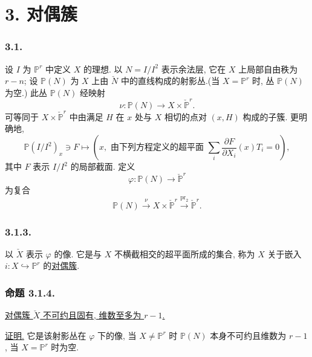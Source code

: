 \section*{3. 对偶簇}

\subsubsection*{3.1.}
设 $I$ 为 $\mathbb P^r$ 中定义 $X$ 的理想. 以 $N=I/I^2$ 表示余法层, 它在 $X$ 上局部自由秩为 $r-n$; 设 $\mathbb P(N)$ 为 $X$ 上由 $\check N$ 中的直线构成的射影丛.(当 $X=\mathbb P^r$ 时, 丛 $\mathbb P(N)$ 为空.) 此丛 $\mathbb P(N)$ 经映射
\[
\nu:\mathbb P(N)\longrightarrow X\times\check{\mathbb P}^{r}.
\]
可等同于 $X\times\check{\mathbb P}^{r}$ 中由满足 $H$ 在 $x$ 处与 $X$ 相切的点对 $(x,H)$ 构成的子簇. 更明确地,
\begin{equation}\tag{3.1.1}
\mathbb P(I/I^2)_x\ni F\longmapsto
\left(x,\text{ 由下列方程定义的超平面 }
\sum_i\frac{\partial F}{\partial X_i}(x)T_i=0\right),
\end{equation}
其中 $F$ 表示 $I/I^2$ 的局部截面. 定义
\begin{equation}\tag{3.1.2}
\varphi:\mathbb P(N)\longrightarrow\check{\mathbb P}^{r}
\end{equation}
为复合
\[
\mathbb P(N)\xrightarrow{\nu}
X\times\check{\mathbb P}^{r}
\xrightarrow{\operatorname{pr}_2}\check{\mathbb P}^{r}.
\]

\subsubsection*{3.1.3.}
以 $\check X$ 表示 $\varphi$ 的像. 它是与 $X$ 不横截相交的超平面所成的集合, 称为 $X$ 关于嵌入 $i:X\hookrightarrow\mathbb P^r$ 的\underline{对偶簇}.

\subsubsection*{命题 3.1.4.}
\underline{对偶簇 $\check X$ 不可约且固有, 维数至多为 $r-1$.}

\noindent\underline{证明.}
它是该射影丛在 $\varphi$ 下的像, 当 $X\ne\mathbb P^r$ 时 $\mathbb P(N)$ 本身不可约且维数为 $r-1$, 当 $X=\mathbb P^r$ 时为空.

